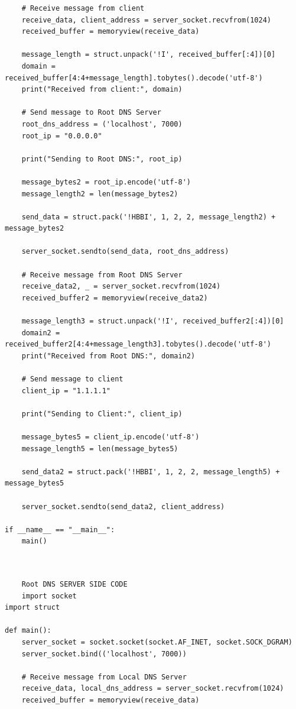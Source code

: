 \documentclass[11pt]{article}
\begin{document}
\begin{itemize}
\begin{itemize}
\begin{verbatim}
    # Receive message from client
    receive_data, client_address = server_socket.recvfrom(1024)
    received_buffer = memoryview(receive_data)

    message_length = struct.unpack('!I', received_buffer[:4])[0]
    domain = received_buffer[4:4+message_length].tobytes().decode('utf-8')
    print("Received from client:", domain)

    # Send message to Root DNS Server
    root_dns_address = ('localhost', 7000)
    root_ip = "0.0.0.0"
    
    print("Sending to Root DNS:", root_ip)

    message_bytes2 = root_ip.encode('utf-8')
    message_length2 = len(message_bytes2)

    send_data = struct.pack('!HBBI', 1, 2, 2, message_length2) + message_bytes2

    server_socket.sendto(send_data, root_dns_address)

    # Receive message from Root DNS Server
    receive_data2, _ = server_socket.recvfrom(1024)
    received_buffer2 = memoryview(receive_data2)

    message_length3 = struct.unpack('!I', received_buffer2[:4])[0]
    domain2 = received_buffer2[4:4+message_length3].tobytes().decode('utf-8')
    print("Received from Root DNS:", domain2)

    # Send message to client
    client_ip = "1.1.1.1"

    print("Sending to Client:", client_ip)

    message_bytes5 = client_ip.encode('utf-8')
    message_length5 = len(message_bytes5)

    send_data2 = struct.pack('!HBBI', 1, 2, 2, message_length5) + message_bytes5

    server_socket.sendto(send_data2, client_address)

if __name__ == "__main__":
    main()



\end{verbatim}

 \begin{verbatim}
    Root DNS SERVER SIDE CODE
    import socket
import struct

def main():
    server_socket = socket.socket(socket.AF_INET, socket.SOCK_DGRAM)
    server_socket.bind(('localhost', 7000))

    # Receive message from Local DNS Server
    receive_data, local_dns_address = server_socket.recvfrom(1024)
    received_buffer = memoryview(receive_data)


\end{verbatim}
\end{itemize}
\end{itemize}
\end{document}
